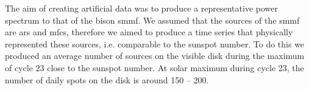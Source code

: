 The aim of creating artificial data was to produce a representative power spectrum to that of the \gls{bison} \gls{smmf}. We assumed that the sources of the \gls{smmf} are \glspl{ar} and \glspl{mfc}, therefore we aimed to produce a time series that physically represented these sources, i.e. comparable to the sunspot number. To do this we produced an average number of sources on the visible disk during the maximum of cycle 23 close to the sunspot number. At solar maximum during cycle 23, the number of daily spots on the disk is around 150 -- 200. 

\begin{figure}[!ht]
	\centering
	\qquad
	 \\
	
	\qquad
	
	\qquad
	

\end{figure}
